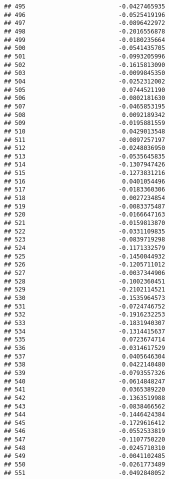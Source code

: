 \documentclass[
]{article}
\begin{document}
\begin{verbatim}
## 495                          -0.0427465935
## 496                          -0.0525419196
## 497                          -0.0896422972
## 498                          -0.2016556878
## 499                          -0.0180235664
## 500                          -0.0541435705
## 501                          -0.0993205996
## 502                          -0.1615813090
## 503                          -0.0099845350
## 504                          -0.0252312002
## 505                           0.0744521190
## 506                          -0.0802181630
## 507                          -0.0465853195
## 508                           0.0092189342
## 509                          -0.0195881559
## 510                           0.0429013548
## 511                          -0.0897257197
## 512                          -0.0248036950
## 513                          -0.0535645835
## 514                          -0.1307947426
## 515                          -0.1273831216
## 516                           0.0401054496
## 517                          -0.0183360306
## 518                           0.0027234854
## 519                          -0.0083375487
## 520                          -0.0166647163
## 521                          -0.0159813870
## 522                          -0.0331109835
## 523                          -0.0839719298
## 524                          -0.1171332579
## 525                          -0.1450044932
## 526                          -0.1205711012
## 527                          -0.0037344906
## 528                          -0.1002360451
## 529                          -0.2102114521
## 530                          -0.1535964573
## 531                          -0.0724746752
## 532                          -0.1916232253
## 533                          -0.1831940307
## 534                          -0.1314415637
## 535                           0.0723674714
## 536                          -0.0314617529
## 537                           0.0405646304
## 538                           0.0422140480
## 539                          -0.0793557326
## 540                          -0.0614848247
## 541                           0.0365389220
## 542                          -0.1363519988
## 543                          -0.0838466562
## 544                          -0.1446424384
## 545                          -0.1729616412
## 546                          -0.0552533819
## 547                          -0.1107750220
## 548                          -0.0245710310
## 549                          -0.0041102485
## 550                          -0.0261773489
## 551                          -0.0492848052

\end{verbatim}
\end{document}
